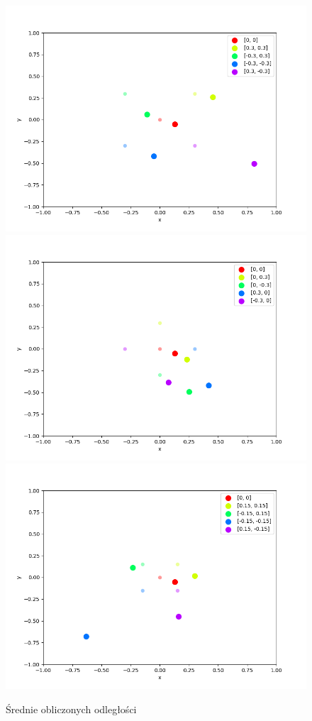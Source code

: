 \begin{figure}[h]
\centering
    \includegraphics[width=.49\textwidth]{pics/mult_lat_2d/positions_1_mean.png}
    \includegraphics[width=.49\textwidth]{pics/mult_lat_2d/positions_2_mean.png}
    \includegraphics[width=.49\textwidth]{pics/mult_lat_2d/positions_3_mean.png}
\caption{Średnie obliczonych odległości}
\end{figure}

